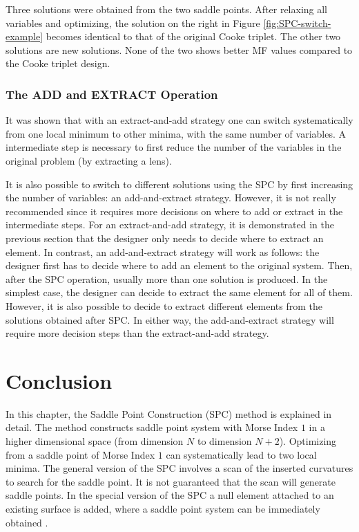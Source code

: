 Three solutions were obtained from the two saddle points. After relaxing all variables and optimizing, the solution on the right in Figure \ref{fig:SPC-switch-example} becomes identical to that of the original Cooke triplet. The other two solutions are new solutions. None of the two shows better MF values compared to the Cooke triplet design. 


\subsubsection{The ADD and EXTRACT Operation }
It was shown that with an extract-and-add strategy one can switch systematically from one local minimum to other minima, with the same number of variables. A intermediate step is necessary to first reduce the number of the variables in the original problem (by extracting a lens). 

It is also possible to switch to different solutions using the SPC by first increasing the number of variables: an add-and-extract strategy. However, it is not really recommended since it requires more decisions on where to add or extract in the intermediate steps. For an extract-and-add strategy, it is demonstrated in the previous section that the designer only needs to decide where to extract an element. In contrast, an add-and-extract strategy will work as follows: the designer first has to decide where to add an element to the original system. Then, after the SPC operation, usually more than one solution is produced. In the simplest case, the designer can decide to extract the same element for all of them. However, it is also possible to decide to extract different elements from the solutions obtained after SPC. In either way, the add-and-extract strategy will require more decision steps than the extract-and-add strategy.

\section{Conclusion}
In this chapter, the Saddle Point Construction (SPC) method is explained in detail. The method constructs saddle point system with Morse Index $1$ in a higher dimensional space (from dimension $N$ to dimension $N+2$). Optimizing from a saddle point of Morse Index $1$ can systematically lead to two local minima. The general version of the SPC involves a scan of the inserted curvatures to search for the saddle point. It is not guaranteed that the scan will generate saddle points. In the special version of the SPC a null element attached to an existing surface is added, where a saddle point system can be immediately obtained \cite{BociortSPCSexplained}. 

